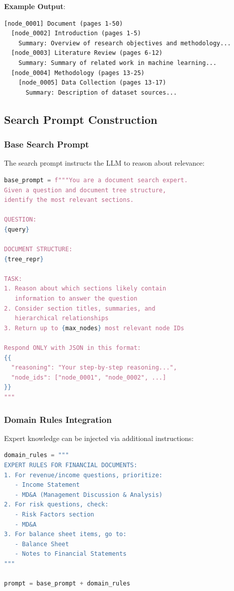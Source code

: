 \textbf{Example Output}:
\begin{lstlisting}
[node_0001] Document (pages 1-50)
  [node_0002] Introduction (pages 1-5)
    Summary: Overview of research objectives and methodology...
  [node_0003] Literature Review (pages 6-12)
    Summary: Summary of related work in machine learning...
  [node_0004] Methodology (pages 13-25)
    [node_0005] Data Collection (pages 13-17)
      Summary: Description of dataset sources...
\end{lstlisting}

\subsection{Search Prompt Construction}

\subsubsection{Base Search Prompt}

The search prompt instructs the LLM to reason about relevance:

\begin{lstlisting}[language=Python, caption=Search Prompt Template]
base_prompt = f"""You are a document search expert.
Given a question and document tree structure,
identify the most relevant sections.

QUESTION:
{query}

DOCUMENT STRUCTURE:
{tree_repr}

TASK:
1. Reason about which sections likely contain
   information to answer the question
2. Consider section titles, summaries, and
   hierarchical relationships
3. Return up to {max_nodes} most relevant node IDs

Respond ONLY with JSON in this format:
{{
  "reasoning": "Your step-by-step reasoning...",
  "node_ids": ["node_0001", "node_0002", ...]
}}
"""
\end{lstlisting}

\subsubsection{Domain Rules Integration}

Expert knowledge can be injected via additional instructions:

\begin{lstlisting}[language=Python, caption=Domain Rules Example]
domain_rules = """
EXPERT RULES FOR FINANCIAL DOCUMENTS:
1. For revenue/income questions, prioritize:
   - Income Statement
   - MD&A (Management Discussion & Analysis)
2. For risk questions, check:
   - Risk Factors section
   - MD&A
3. For balance sheet items, go to:
   - Balance Sheet
   - Notes to Financial Statements
"""

prompt = base_prompt + domain_rules
\end{lstlisting}

